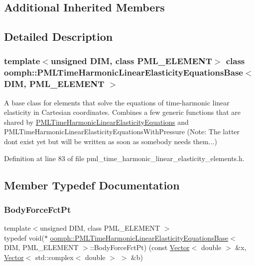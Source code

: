 \subsection*{Additional Inherited Members}


\subsection{Detailed Description}
\subsubsection*{template$<$unsigned D\+IM, class P\+M\+L\+\_\+\+E\+L\+E\+M\+E\+NT$>$\newline
class oomph\+::\+P\+M\+L\+Time\+Harmonic\+Linear\+Elasticity\+Equations\+Base$<$ D\+I\+M, P\+M\+L\+\_\+\+E\+L\+E\+M\+E\+N\+T $>$}

A base class for elements that solve the equations of time-\/harmonic linear elasticity in Cartesian coordinates. Combines a few generic functions that are shared by \hyperlink{classoomph_1_1PMLTimeHarmonicLinearElasticityEquations}{P\+M\+L\+Time\+Harmonic\+Linear\+Elasticity\+Equations} and P\+M\+L\+Time\+Harmonic\+Linear\+Elasticity\+Equations\+With\+Pressure (Note\+: The latter don\textquotesingle{}t exist yet but will be written as soon as somebody needs them...) 

Definition at line 83 of file pml\+\_\+time\+\_\+harmonic\+\_\+linear\+\_\+elasticity\+\_\+elements.\+h.



\subsection{Member Typedef Documentation}
\mbox{\label{classoomph_1_1PMLTimeHarmonicLinearElasticityEquationsBase_a04218d2a825726c0cd6b975d1ecd2f12}} 
\subsubsection{\texorpdfstring{Body\+Force\+Fct\+Pt}{BodyForceFctPt}}
{\footnotesize\ttfamily template$<$unsigned D\+IM, class P\+M\+L\+\_\+\+E\+L\+E\+M\+E\+NT $>$ \\
typedef void($\ast$ \hyperlink{classoomph_1_1PMLTimeHarmonicLinearElasticityEquationsBase}{oomph\+::\+P\+M\+L\+Time\+Harmonic\+Linear\+Elasticity\+Equations\+Base}$<$ D\+IM, P\+M\+L\+\_\+\+E\+L\+E\+M\+E\+NT $>$\+::Body\+Force\+Fct\+Pt) (const \hyperlink{classoomph_1_1Vector}{Vector}$<$ double $>$ \&x, \hyperlink{classoomph_1_1Vector}{Vector}$<$ std\+::complex$<$ double $>$ $>$ \&b)}



